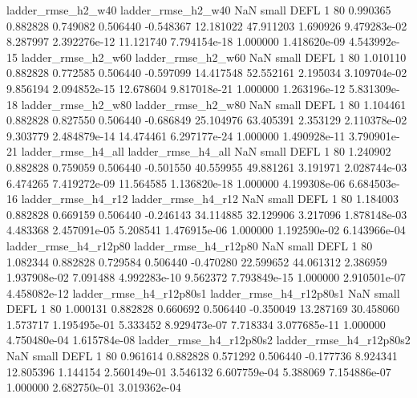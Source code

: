       ladder_rmse_h2_w40       ladder_rmse_h2_w40                   NaN      small     DEFL                 1 80 0.990365       0.882828 0.749082       0.506440   -0.548367     12.181022     47.911203     1.690926   9.479283e-02  8.287997 2.392276e-12    11.121740   7.794154e-18            1.000000    1.418620e-09        4.543992e-15
      ladder_rmse_h2_w60       ladder_rmse_h2_w60                   NaN      small     DEFL                 1 80 1.010110       0.882828 0.772585       0.506440   -0.597099     14.417548     52.552161     2.195034   3.109704e-02  9.856194 2.094852e-15    12.678604   9.817018e-21            1.000000    1.263196e-12        5.831309e-18
      ladder_rmse_h2_w80       ladder_rmse_h2_w80                   NaN      small     DEFL                 1 80 1.104461       0.882828 0.827550       0.506440   -0.686849     25.104976     63.405391     2.353129   2.110378e-02  9.303779 2.484879e-14    14.474461   6.297177e-24            1.000000    1.490928e-11        3.790901e-21
      ladder_rmse_h4_all       ladder_rmse_h4_all                   NaN      small     DEFL                 1 80 1.240902       0.882828 0.759059       0.506440   -0.501550     40.559955     49.881261     3.191971   2.028744e-03  6.474265 7.419272e-09    11.564585   1.136820e-18            1.000000    4.199308e-06        6.684503e-16
      ladder_rmse_h4_r12       ladder_rmse_h4_r12                   NaN      small     DEFL                 1 80 1.184003       0.882828 0.669159       0.506440   -0.246143     34.114885     32.129906     3.217096   1.878148e-03  4.483368 2.457091e-05     5.208541   1.476915e-06            1.000000    1.192590e-02        6.143966e-04
   ladder_rmse_h4_r12p80    ladder_rmse_h4_r12p80                   NaN      small     DEFL                 1 80 1.082344       0.882828 0.729584       0.506440   -0.470280     22.599652     44.061312     2.386959   1.937908e-02  7.091488 4.992283e-10     9.562372   7.793849e-15            1.000000    2.910501e-07        4.458082e-12
 ladder_rmse_h4_r12p80s1  ladder_rmse_h4_r12p80s1                   NaN      small     DEFL                 1 80 1.000131       0.882828 0.660692       0.506440   -0.350049     13.287169     30.458060     1.573717   1.195495e-01  5.333452 8.929473e-07     7.718334   3.077685e-11            1.000000    4.750480e-04        1.615784e-08
 ladder_rmse_h4_r12p80s2  ladder_rmse_h4_r12p80s2                   NaN      small     DEFL                 1 80 0.961614       0.882828 0.571292       0.506440   -0.177736      8.924341     12.805396     1.144154   2.560149e-01  3.546132 6.607759e-04     5.388069   7.154886e-07            1.000000    2.682750e-01        3.019362e-04
